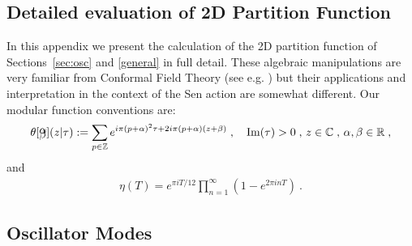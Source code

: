 \documentclass[11pt]{article}
\numberwithin{equation}{section}
\begin{document}
\begin{appendix}

\section{Detailed evaluation of 2D Partition Function}\label{app:details}

In this appendix we present the calculation of the 2D partition function of Sections~\ref{sec:osc} and \ref{general} in full detail. These algebraic manipulations are very familiar from Conformal Field Theory (see e.g. \cite{DiFrancesco:1997nk}) but their applications and interpretation in the context of the Sen action are somewhat different. Our modular function conventions are:
\begin{align}\label{thetas}
	\theta \! \begin{bmatrix} \vspace{-20pt} \\ \alpha  \\ \vspace{-20pt} \\ \beta \\ \vspace{-20pt} \end{bmatrix} \! ( z | \tau ) := \sum_{p\in{\mathbb Z}}
	e^{i\pi (p+\alpha)^2 \tau +2i\pi (p+\alpha)(z+\beta)}\;,\quad \mathrm{Im}(\tau)>0\;, \, z \in \mathbb{C}\;,  \, \alpha, \beta \in \mathbb{R}\;,  
	\end{align}
and
\begin{align}
\eta(T) = e^{\pi i T/12}\prod_{n=1}^\infty (1- e^{2\pi in T }) \ .
\end{align}



\subsection{Oscillator Modes}\label{app:osc}


\end{appendix}
\end{document}
